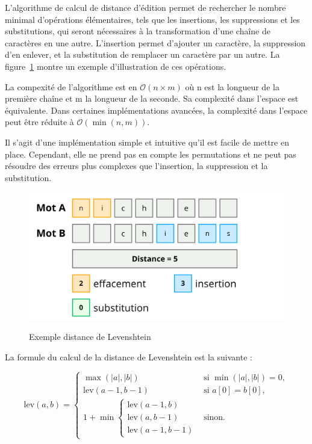 \documentclass[a4paper, 11pt]{report}
\begin{document}
L'algorithme de calcul de distance d'édition permet de rechercher le nombre minimal d'opérations élémentaires, tels que les insertions, les suppressions et les substitutions, qui seront nécessaires à la transformation d'une chaîne de caractères en une autre. L'insertion permet d'ajouter un caractère, la suppression d'en enlever, et la substitution de remplacer un caractère par un autre. La figure~\ref{fig:levenshtein} montre un exemple d'illustration de ces opérations. \par \vspace{\baselineskip}

La compexité de l'algorithme est en $\mathcal{O}(n \times m)$  où n est la longueur de la première chaîne et m la longueur de la seconde. Sa complexité dans l'espace est équivalente. Dans certaines implémentations avancées, la complexité dans l'espace peut être réduite à $\mathcal{O}(\min(n,m))$. \par \vspace{\baselineskip}

Il s'agit d'une implémentation simple et intuitive qu'il est facile de mettre en place. Cependant, elle ne prend pas en compte les permutations et ne peut pas résoudre des erreurs plus complexes que l'insertion, la suppression et la substitution.


\begin{figure}[H]
	\begin{center}
		{\includegraphics[height=0.45\textwidth]{images/levenshtein.png}}
	\end{center}
	\caption{Exemple distance de Levenshtein}
	\label{fig:levenshtein}
\end{figure}

\noindent{}La formule du calcul de la distance de Levenshtein est la suivante :

\[
	\text{lev}(a, b) =
	\begin{cases}
		\max(|a|, |b|)           & \text{si } \min(|a|, |b|) = 0, \\
		\text{lev}(a - 1, b - 1) & \text{si } a[0] = b[0],        \\
		1 + \min \begin{cases}
			         \text{lev}(a - 1, b) \\
			         \text{lev}(a, b - 1) \\
			         \text{lev}(a - 1, b - 1)
		         \end{cases} & \text{sinon}.
	\end{cases}
\]
\end{document}
